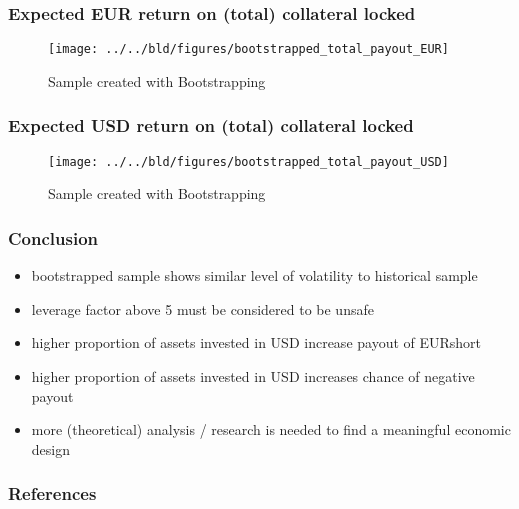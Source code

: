 \documentclass[11pt]{beamer}
\begin{document}
\begin{frame}[t]
    \frametitle{Expected EUR return on (total) collateral locked}
    \begin{figure}
        \caption{Sample created with Bootstrapping}
        \texttt{[image: ../../bld/figures/bootstrapped\_total\_payout\_EUR]}
    \end{figure}
\end{frame}

\begin{frame}[t]
    \frametitle{Expected USD return on (total) collateral locked}
    \begin{figure}
        \caption{Sample created with Bootstrapping}
        \texttt{[image: ../../bld/figures/bootstrapped\_total\_payout\_USD]}
    \end{figure}
\end{frame}

\begin{frame}[t]
    \frametitle{Conclusion}
    \begin{itemize}
        \item bootstrapped sample shows similar level of volatility to historical sample
        \item leverage factor above 5 must be considered to be unsafe
        \item higher proportion of assets invested in USD increase payout of EURshort
        \item higher proportion of assets invested in USD increases chance of negative payout
        \item more (theoretical) analysis / research is needed to find a meaningful economic design
    \end{itemize}

    \note{~}
\end{frame}

 {
    \begin{frame}
        \frametitle{}
    \end{frame}

}

\begin{frame}[allowframebreaks]
    \frametitle{References}

    \renewcommand{\bibfont}{\normalfont\footnotesize}
    \printbibliography

\end{frame}
\end{document}
